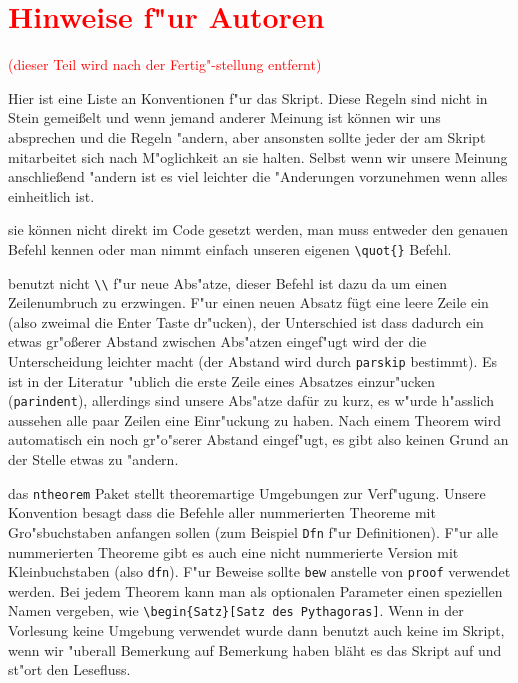 \documentclass[paper=A4, twoside, chapterprefix=true, bibliography=totoc, headsepline]{scrbook}
\begin{document}
\section*{\textcolor{red}{Hinweise f"ur Autoren}}
\textcolor{red}{(dieser Teil wird nach der Fertig"-stellung entfernt)}

Hier ist eine Liste an Konventionen f"ur das Skript.
Diese Regeln sind nicht in Stein gemei\ss elt und wenn jemand anderer Meinung ist können wir uns absprechen und die Regeln "andern, aber ansonsten sollte jeder der am Skript mitarbeitet sich nach M"oglichkeit an sie halten.
Selbst wenn wir unsere Meinung anschließend "andern ist es viel leichter die "Anderungen vorzunehmen wenn alles einheitlich ist.

\begin{description}[font=\normalfont\itshape]
\item[Anf"uhrungszeichen:]
	sie können nicht direkt im Code gesetzt werden, man muss entweder den genauen Befehl kennen oder man nimmt einfach unseren eigenen \verb|\quot{}| Befehl.
\item[Abs"atze:]
	benutzt nicht \verb|\\| f"ur neue Abs"atze, dieser Befehl ist dazu da um einen Zeilenumbruch zu erzwingen.
	F"ur einen neuen Absatz fügt eine leere Zeile ein (also zweimal die Enter Taste dr"ucken), der Unterschied ist dass dadurch ein etwas gr"o\ss erer Abstand zwischen Abs"atzen eingef"ugt wird der die Unterscheidung leichter macht (der Abstand wird durch \verb|parskip| bestimmt).
	Es ist in der Literatur "ublich die erste Zeile eines Absatzes einzur"ucken (\verb|parindent|), allerdings sind unsere Abs"atze dafür zu kurz, es w"urde h"asslich aussehen alle paar Zeilen eine Einr"uckung zu haben.
	Nach einem Theorem wird automatisch ein noch gr"o"serer Abstand eingef"ugt, es gibt also keinen Grund an der Stelle etwas zu "andern.
\item[Theoreme:]
	das \verb|ntheorem| Paket stellt theoremartige Umgebungen zur Verf"ugung.
	Unsere Konvention besagt dass die Befehle aller nummerierten Theoreme mit Gro"sbuchstaben anfangen sollen (zum Beispiel \verb|Dfn| f"ur Definitionen).
	F"ur alle nummerierten Theoreme gibt es auch eine nicht nummerierte Version mit Kleinbuchstaben (also \verb|dfn|).
	F"ur Beweise sollte \verb|bew| anstelle von \verb|proof| verwendet werden.
	Bei jedem Theorem kann man als optionalen Parameter einen speziellen Namen vergeben, wie \verb|\begin{Satz}[Satz des Pythagoras]|.
	Wenn in der Vorlesung keine Umgebung verwendet wurde dann benutzt auch keine im Skript, wenn wir "uberall Bemerkung auf Bemerkung haben bläht es das Skript auf und st"ort den Lesefluss.

\end{description}
\end{document}
